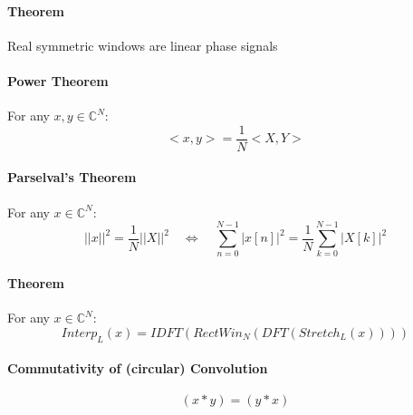 \paragraph{Theorem}
Real symmetric windows are linear phase signals

\paragraph{Power Theorem}
For any $x, y \in \mathbb{C}^N$:
\begin{equation}
 <x, y> = \frac{1}{N} <X,Y>
\end{equation}

\paragraph{Parselval's Theorem}
For any $x \in \mathbb{C}^N$:
\begin{equation}
 || x ||^2 = \frac{1}{N} ||X||^2 \quad \Leftrightarrow \quad \sum_{n=0}^{N-1} |x[n]|^2 = \frac{1}{N} \sum_{k=0}^{N-1} |X[k]|^2
\end{equation}

\paragraph{Theorem}
For any $x \in \mathbb{C}^N$:
\begin{equation}
 Interp_L(x) = IDFT(RectWin_N(DFT(Stretch_L(x))))
\end{equation}










\paragraph{Commutativity of (circular) Convolution}
\begin{equation}
  (x * y) = (y * x)
\end{equation}







